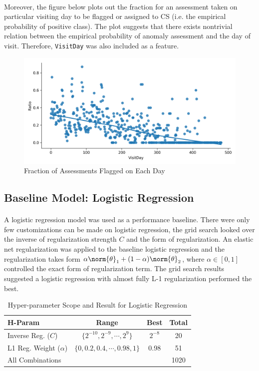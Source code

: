 \documentclass[11pt]{article}
\begin{document}
	\paragraph{} Moreover, the figure below plots out the fraction for an assessment taken on particular visiting day to be flagged or assigned to CS (i.e. the empirical probability of positive class). The plot suggests that there exists nontrivial relation between the empirical probability of anomaly assessment and the day of visit. Therefore, \texttt{VisitDay} was also included as a feature.
	\begin{figure}[H]
		\centering
		\includegraphics[width=0.7\linewidth]{figures/alert_ratio_days.png}
		\caption{Fraction of Assessments Flagged on Each Day}
	\end{figure}
	
	\subsection{Baseline Model: Logistic Regression}
	\paragraph{} A logistic regression model was used as a performance baseline. There were only few customizations can be made on logistic regression, the grid search looked over the inverse of regularization strength $C$ and the form of regularization. An elastic net regularization was applied to the baseline logistic regression and the regularization takes form $\alpha \norm{\theta}_1 + (1 - \alpha) \norm{\theta}_2$, where $\alpha \in [0, 1]$ controlled the exact form of regularization term. The grid search results suggested a logistic regression with almost fully L-1 regularization performed the best.
	\begin{table}[H]
		\centering
		\begin{tabular}{l|c|c|c}
		H-Param & Range & Best & Total \\
 		\hline
 		Inverse Reg. ($C$) & $\{2^{-10}, 2^{-9}, \cdots, 2^9\}$ & $2^{-8}$ & 20 \\
 		L1 Reg. Weight ($\alpha$) & $\{0, 0.2, 0.4, \cdots, 0.98, 1\}$ & 0.98 & 51 \\
 		\hline
 		All Combinations & & & 1020 
		\end{tabular}
		\caption{Hyper-parameter Scope and Result for Logistic Regression}
	\end{table}
 	
\end{document}
